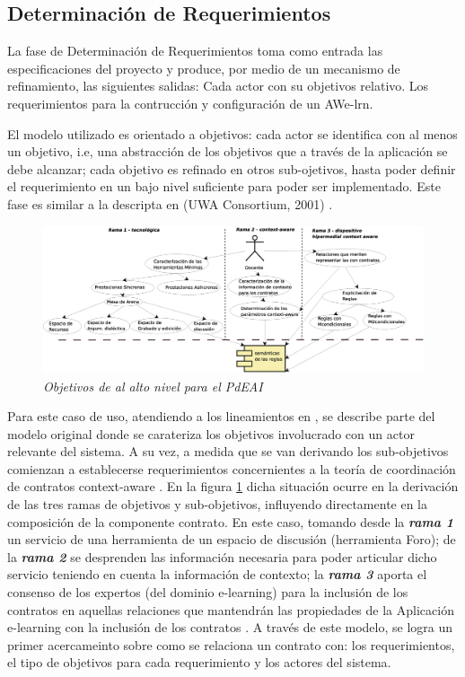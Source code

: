 \documentclass[12 pt,a4paper]{llncs}
\begin{document}
\subsection{Determinación de Requerimientos} \label{sdr}

La fase de Determinación de Requerimientos toma como entrada las especificaciones del proyecto y produce, por medio de un mecanismo de refinamiento, las siguientes salidas: Cada actor con su objetivos relativo. Los requerimientos para la contrucción y configuración de un AWe-lrn.
 
El modelo utilizado es orientado a objetivos: cada actor se identifica con al menos un objetivo, i.e, una abstracción de los objetivos que a través de la aplicación se debe alcanzar; cada objetivo es refinado en otros sub-ojetivos, hasta poder definir el requerimiento en un bajo nivel suficiente para poder ser implementado. Este fase es similar a la descripta en (UWA Consortium, 2001) \cite{UWA}. 

	\begin{figure}[!h]
        	\begin{center}
		\includegraphics[width= 5 in,totalheight=3 in]{Requerimientos.eps}
                \caption{\small \sl Objetivos de al alto nivel  para el PdEAI} \label{requerimientos}
         	\end{center}
         \end{figure}

Para este caso de uso, atendiendo a los lineamientos en \cite{libro}, se describe parte del modelo original donde se carateriza los objetivos involucrado con un actor relevante del sistema. A su vez, a medida que se van derivando los sub-objetivos comienzan a establecerse requerimientos concernientes a la teoría de coordinación de contratos context-aware \cite{libro5,fiadeiro}. En la figura \ref{requerimientos} dicha situación ocurre en la derivación de las tres ramas de objetivos y sub-objetivos, influyendo directamente en la composición de la componente contrato. En este caso, tomando desde la \textit{\textbf{rama 1}} un servicio de una herramienta de un espacio de discusión (herramienta Foro); de la \textit{\textbf{rama 2}} se desprenden las información necesaria para poder articular dicho servicio teniendo en cuenta la información de contexto;  la \textit{\textbf{rama 3}} aporta el consenso de los expertos (del dominio e-learning) para la inclusión de los contratos en aquellas relaciones que mantendrán las propiedades de la Aplicación e-learning con la inclusión de los contratos \cite{libro5}. A través de este modelo, se logra un primer acercameinto sobre como se relaciona un contrato con: los requerimientos, el tipo de objetivos para cada requerimiento y los actores del sistema. 
\end{document}
